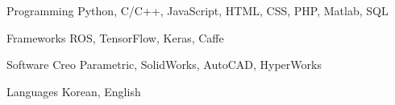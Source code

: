 


\begin{cvskills}


\cvskill
{Programming} %
{Python, C/C++, JavaScript, HTML, CSS, PHP, Matlab, SQL} %


\cvskill
{Frameworks} %
{ROS, TensorFlow, Keras, Caffe} %


\cvskill
{Software} %
{Creo Parametric, SolidWorks, AutoCAD, HyperWorks} %


\cvskill
{Languages} %
{Korean, English} %


\end{cvskills}